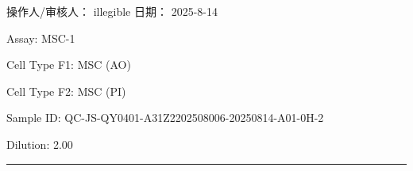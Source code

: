 \documentclass[UTF8,10pt,a4paper,fontset=fandol]{ctexart}
\newcommand{\fieldvalue}[1]{#1}
\newcommand{\handwritten}[1]{#1}
\begin{document}
\medskip

\noindent
\begin{minipage}[t]{0.47\linewidth}
\centering
\fbox{\rule{0pt}{0.22\textheight}\rule{0.95\linewidth}{0pt}}
\end{minipage}
\hfill
\begin{minipage}[t]{0.47\linewidth}
\centering
\fbox{\rule{0pt}{0.22\textheight}\rule{0.95\linewidth}{0pt}}
\end{minipage}

\medskip

\noindent
\begin{minipage}[t]{0.47\linewidth}
\centering
\fbox{\rule{0pt}{0.22\textheight}\rule{0.95\linewidth}{0pt}}
\end{minipage}
\hfill
\begin{minipage}[t]{0.47\linewidth}
\centering
\fbox{\rule{0pt}{0.22\textheight}\rule{0.95\linewidth}{0pt}}
\end{minipage}

\vfill

\noindent 操作人/审核人：
\fieldvalue{\handwritten{illegible}}
\hfill
日期：
\fieldvalue{\handwritten{2025-8-14}}

\newpage

\noindent
Assay: %
\fieldvalue{MSC-1}

\medskip
\noindent
Cell Type F1: %
\fieldvalue{MSC (AO)}

\noindent
Cell Type F2: %
\fieldvalue{MSC (PI)}

\medskip
\noindent
Sample ID: %
\fieldvalue{QC-JS-QY0401-A31Z2202508006-20250814-A01-0H-2}

\noindent
Dilution: %
\fieldvalue{2.00}

\medskip
\noindent
\rule{\linewidth}{0.4pt}
\end{document}
